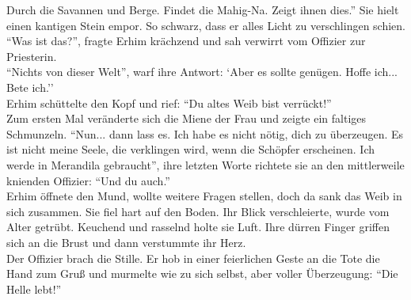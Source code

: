 Durch die Savannen und Berge. Findet die Mahig-Na. Zeigt ihnen dies.'' Sie hielt einen kantigen 
Stein empor. So schwarz, dass er alles Licht zu verschlingen schien.\\
``Was ist das?'', fragte Erhim krächzend und sah verwirrt vom Offizier zur Priesterin.\\
``Nichts von dieser Welt'', warf ihre Antwort: `Aber es sollte genügen. Hoffe ich... Bete ich.''\\
Erhim schüttelte den Kopf und rief: ``Du altes Weib bist verrückt!''\\
Zum ersten Mal veränderte sich die Miene der Frau und zeigte ein faltiges Schmunzeln. ``Nun... 
dann lass es. Ich habe es nicht nötig, dich zu überzeugen. Es ist nicht meine Seele, die 
verklingen wird, wenn die Schöpfer erscheinen. Ich werde in Merandila gebraucht'', ihre letzten 
Worte richtete sie an den mittlerweile knienden Offizier: ``Und du auch.''\\
Erhim öffnete den Mund, wollte weitere Fragen stellen, doch da sank das Weib in sich zusammen. Sie 
fiel hart auf den Boden. Ihr Blick verschleierte, wurde vom Alter getrübt. Keuchend und rasselnd 
holte sie Luft. Ihre dürren Finger griffen sich an die Brust und dann verstummte ihr Herz.\\
Der Offizier brach die Stille. Er hob in einer feierlichen Geste an die Tote die Hand zum Gruß und 
murmelte wie zu sich selbst, aber voller Überzeugung: ``Die Helle lebt!''\\







